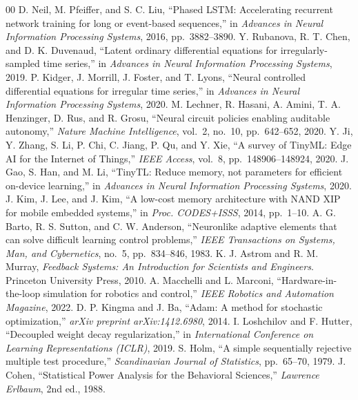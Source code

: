 \documentclass[conference]{IEEEtran}
\begin{document}
\begin{thebibliography}{00}
 D. Neil, M. Pfeiffer, and S. C. Liu, ``Phased LSTM: Accelerating recurrent network training for long or event-based sequences,'' in \textit{Advances in Neural Information Processing Systems}, 2016, pp.~3882--3890.
 Y. Rubanova, R. T. Chen, and D. K. Duvenaud, ``Latent ordinary differential equations for irregularly-sampled time series,'' in \textit{Advances in Neural Information Processing Systems}, 2019.
 P. Kidger, J. Morrill, J. Foster, and T. Lyons, ``Neural controlled differential equations for irregular time series,'' in \textit{Advances in Neural Information Processing Systems}, 2020.
 M. Lechner, R. Hasani, A. Amini, T. A. Henzinger, D. Rus, and R. Grosu, ``Neural circuit policies enabling auditable autonomy,'' \textit{Nature Machine Intelligence}, vol.~2, no.~10, pp.~642--652, 2020.
 Y. Ji, Y. Zhang, S. Li, P. Chi, C. Jiang, P. Qu, and Y. Xie, ``A survey of TinyML: Edge AI for the Internet of Things,'' \textit{IEEE Access}, vol.~8, pp.~148906--148924, 2020.
 J. Gao, S. Han, and M. Li, ``TinyTL: Reduce memory, not parameters for efficient on-device learning,'' in \textit{Advances in Neural Information Processing Systems}, 2020.
 J. Kim, J. Lee, and J. Kim, ``A low-cost memory architecture with NAND XIP for mobile embedded systems,'' in \textit{Proc. CODES+ISSS}, 2014, pp.~1--10.
 A. G. Barto, R. S. Sutton, and C. W. Anderson, ``Neuronlike adaptive elements that can solve difficult learning control problems,'' \textit{IEEE Transactions on Systems, Man, and Cybernetics}, no.~5, pp.~834--846, 1983.
 K. J. Astrom and R. M. Murray, \textit{Feedback Systems: An Introduction for Scientists and Engineers}. Princeton University Press, 2010.
 A. Macchelli and L. Marconi, ``Hardware-in-the-loop simulation for robotics and control,'' \textit{IEEE Robotics and Automation Magazine}, 2022.
 D. P. Kingma and J. Ba, ``Adam: A method for stochastic optimization,'' \textit{arXiv preprint arXiv:1412.6980}, 2014.
 I. Loshchilov and F. Hutter, ``Decoupled weight decay regularization,'' in \textit{International Conference on Learning Representations (ICLR)}, 2019.
 S. Holm, ``A simple sequentially rejective multiple test procedure,'' \textit{Scandinavian Journal of Statistics}, pp.~65--70, 1979.
 J. Cohen, ``Statistical Power Analysis for the Behavioral Sciences,'' \textit{Lawrence Erlbaum}, 2nd ed., 1988.
\end{thebibliography}
\end{document}
